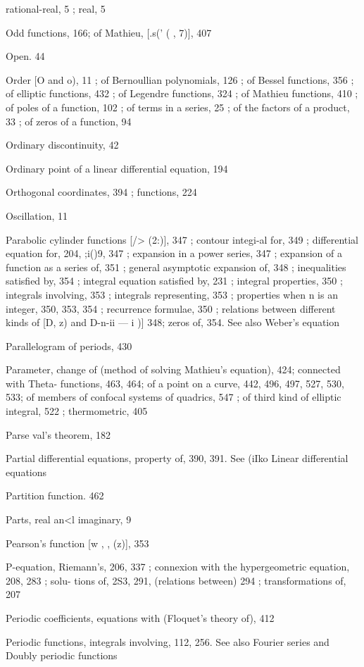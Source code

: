 rational-real, 5 ; real, 5

Odd functions, 166; of Mathieu, [.s(' ( , 7)], 407

Open. 44

Order [O and o), 11 ; of Bernoullian polynomials, 126 ; of Bessel functions, 356 ; of elliptic
functions, 432 ; of Legendre functions, 324 ; of Mathieu functions, 410 ; of poles of a
function, 102 ; of terms in a series, 25 ; of the factors of a product, 33 ; of zeros of a
function, 94

Ordinary discontinuity, 42

Ordinary point of a linear differential equation, 194

Orthogonal coordinates, 394 ; functions, 224

Oscillation, 11

Parabolic cylinder functions [/>  (2:)], 347 ; contour integi-al for, 349 ; differential equation for,
204, ;i()9, 347 ; expansion in a power series, 347 ; expansion of a function as a series of, 351 ;
general asymptotic expansion of, 348 ; inequalities satisfied by, 354 ; integral equation
satisfied by, 231 ; integral properties, 350 ; integrals involving, 353 ; integrals representing,
353 ; properties when n is an integer, 350, 353, 354 ; recurrence formulae, 350 ; relations
between different kinds of [D,  z) and D-n-ii — i )]  348; zeros of, 354. See also Weber's
equation

Parallelogram of periods, 430

Parameter, change of (method of solving Mathieu's equation), 424; connected with Theta-
functions, 463, 464; of a point on a curve, 442, 496, 497, 527, 530, 533; of members of
confocal systems of quadrics, 547 ; of third kind of elliptic integral, 522 ; thermometric, 405

Parse val's theorem, 182

Partial differential equations, property of, 390, 391. See (iIko Linear differential equations

Partition function. 462

Parts, real an<l imaginary, 9

Pearson's function [w ,  , (z)], 353

P-equation, Riemann's, 206, 337 ; connexion with the hypergeometric equation, 208, 283 ; solu-
tions of, 2S3, 291, (relations between) 294 ; transformations of, 207

Periodic coefficients, equations with (Floquet's theory of), 412

Periodic functions, integrals involving, 112, 256. See also Fourier series and Doubly periodic
functions

